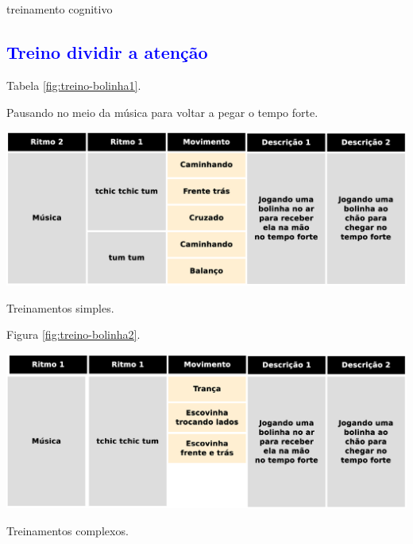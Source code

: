 

\chapter{\textcolor{blue}{ \Bodycontrol}}

treinamento cognitivo

\section{\textcolor{blue}{ Treino dividir  a atenção}}


Tabela \ref{fig:treino-bolinha1}.

Pausando no meio da música para voltar a pegar o tempo forte.

\begin{table}[!h]
  \centering
    \includegraphics[width=1.0\textwidth]{chapters/cap-body-control/treino-bolinha1.eps}
\caption{Treinamentos simples.}
\label{fig:treino-bolinha1}
\end{table}

Figura \ref{fig:treino-bolinha2}.

\begin{table}[!h]
  \centering
    \includegraphics[width=1.0\textwidth]{chapters/cap-body-control/treino-bolinha2.eps}
\caption{Treinamentos complexos.}
\label{fig:treino-bolinha2}
\end{table}

